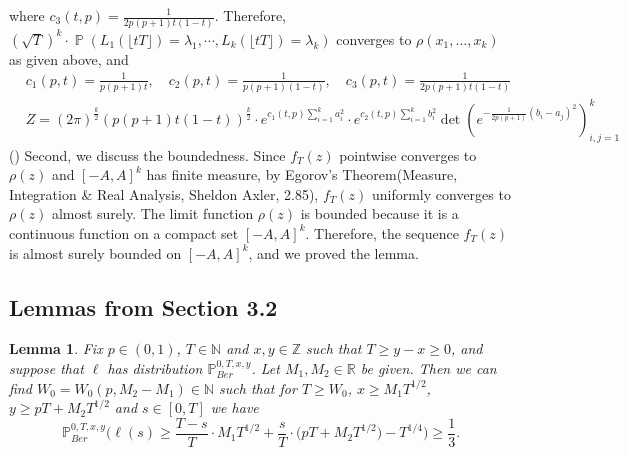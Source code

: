 \documentclass[12pt]{article}
\newtheorem{lemma}{Lemma}
\DeclareMathOperator{\pr}{\mathbb{P}}
\begin{document}
where $c_{3}(t,p)=\frac{1}{2p(p+1)t(1-t)}$.
Therefore, $(\sqrt{T})^{k}\cdot\pr(L_1(\lfloor tT\rfloor)=\lambda_1,\cdots, L_k(\lfloor tT\rfloor)=\lambda_k)$ converges to $\rho(x_{1},\dots,x_{k})$ as given above, and 
\begin{align*}
	&c_{1}(p,t)=\frac{1}{p(p+1)t}, \quad c_{2}(p,t)=\frac{1}{p(p+1)(1-t)}, \quad c_{3}(p,t)=\frac{1}{2p(p+1)t(1-t)}\\
	&Z=(2\pi)^{\frac{k}{2}}(p(p+1)t(1-t))^{\frac{k}{2}}\cdot e^{c_{1}(t,p)\sum_{i=1}^{k}a_{i}^{2}}\cdot e^{c_{2}(t,p)\sum_{i=1}^{k}b_{i}^{2}}\det\left(e^{-\frac{1}{2p(p+1)}(b_{i}-a_{j})^{2}}\right)_{i,j=1}^{k}
\end{align*}
() Second, we discuss the boundedness. Since $f_{T}(z)$ pointwise converges to $\rho(z)$ and $[-A,A]^{k}$ has finite measure, by Egorov's Theorem(Measure, Integration \& Real Analysis, Sheldon Axler, 2.85), $f_{T}(z)$ uniformly converges to $\rho(z)$ almost surely. The limit function $\rho(z)$ is bounded because it is a continuous function on a compact set $[-A,A]^{k}$. Therefore, the sequence $f_{T}(z)$ is almost surely bounded on $[-A,A]^{k}$, and we proved the lemma.



	\subsection*{Lemmas from Section 3.2}
	
	\begin{lemma}\label{LemmaHalfS4} Fix $p \in (0,1)$, $T \in \mathbb{N}$ and $x, y\in \mathbb{Z}$ such that $T \geq y-x \geq 0$, and suppose that $\ell$ has distribution $\mathbb{P}^{0,T,x,y}_{Ber}$. Let $M_1, M_2 \in \mathbb{R}$ be given. Then we can find $W_0 = W_0(p,M_2 - M_1) \in \mathbb{N}$ such that for $T \geq W_0$, $x \geq M_1 T^{1/2}$, $y \geq pT + M_2 T^{1/2}$ and $s \in [0,T]$ we have
		\begin{equation}\label{halfEq1S4}
		\mathbb{P}^{0,T,x,y}_{Ber}\Big( \ell(s)  \geq \frac{T-s}{T} \cdot M_1 T^{1/2} + \frac{s}{T} \cdot \big(p T + M_2 T^{1/2}\big) - T^{1/4} \Big) \geq \frac{1}{3}.
		\end{equation}
	\end{lemma}
\end{document}
